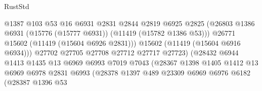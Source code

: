 \begin{lexlean}{RustStd}
\begin{coremodule}
                                          @1387
                                          @103
                                          @53
                                          @16
                                          @6931
                                          @2831
                                          @2844
                                          @2819
                                          @6925
                                          @2825
                                          (@26803
                                            @1386
                                            @6931
                                            (@15776 (@15777 @6931))
                                            (@11419 (@15782 @1386 @53)))
                                          @26771
                                          @15602
                                          (@11419 (@15604 @6926 @2831)))
                                        @15602
                                        (@11419 (@15604 @6916 @6934)))
                                      @27702
                                      @27705
                                      @27708
                                      @27712
                                      @27717
                                      @27723)
                                    (@28432
                                      @6944
                                      @1413
                                      @1435
                                      @13
                                      @6969
                                      @6993
                                      @7019
                                      @7043
                                      (@28367
                                        @1398
                                        @1405
                                        @1412
                                        @13
                                        @6969
                                        @6978
                                        @2831
                                        @6993
                                        (@28378
                                          @1397
                                          @489
                                          @23309
                                          @6969
                                          @6976
                                          @6182
                                          (@28387
                                            @1396
                                            @53

\end{coremodule}
\end{lexlean}
